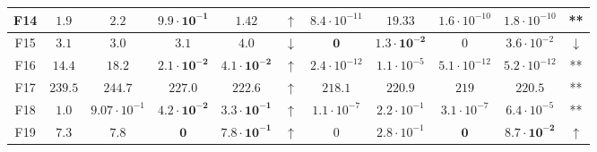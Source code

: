\begin{table*}[!t]
\begin{scriptsize}
\begin{tabular}{c || c c | c c c || c c | c c c}
F14 & $1.9$                & $2.2$                 & $\mathbf{9.9 \cdot 10^{-1}}$  & $\mathbf{1.42}$               & $\uparrow$        & $8.4 \cdot 10^{-11}$ & $19.33$                       & $1.6 \cdot 10^{-10}$          & $1.8 \cdot 10^{-10}$          & **                 \\ \hline
F15 & $\mathbf{3.1}$       & $\mathbf{3.0}$        & $3.1$                         & $4.0$                         & $\downarrow$      & $\mathbf{0}$         & $\mathbf{1.3 \cdot 10^{-2}}$  & $0$                           & $3.6 \cdot 10^{-2}$           & $\downarrow$       \\ \hline
F16 & $14.4$               & $18.2$                & $\mathbf{2.1 \cdot 10^{-2}}$  & $\mathbf{4.1 \cdot 10^{-2}}$  & $\uparrow$        & $2.4 \cdot 10^{-12}$ & $1.1 \cdot 10^{-5}$           & $5.1 \cdot 10^{-12}$          & $5.2 \cdot 10^{-12}$          & **                 \\ \hline
F17 & $239.5$              & $244.7$               & $\mathbf{227.0}$              & $\mathbf{222.6}$              & $\uparrow$        & $218.1$              & $220.9$                       & $219$                         & $220.5$                       & **                 \\ \hline
F18 & $1.0$                & $9.07 \cdot 10^{-1}$  & $\mathbf{4.2 \cdot 10^{-2}}$  & $\mathbf{3.3 \cdot 10^{-1}}$  & $\uparrow$        & $1.1 \cdot 10^{-7}$  & $2.2 \cdot 10^{-1}$           & $3.1 \cdot 10^{-7}$           & $6.4 \cdot 10^{-5}$           & **                 \\ \hline
F19 & $7.3$                & $7.8$                 & $\mathbf{0}$                  & $\mathbf{7.8 \cdot 10^{-1}}$  & $\uparrow$        & $0$                  & $2.8 \cdot 10^{-1}$           & $\mathbf{0}$                  & $\mathbf{8.7 \cdot 10^{-2}}$  & $\uparrow$         \\ \hline
\end{tabular}
\end{scriptsize}
\end{table*}
